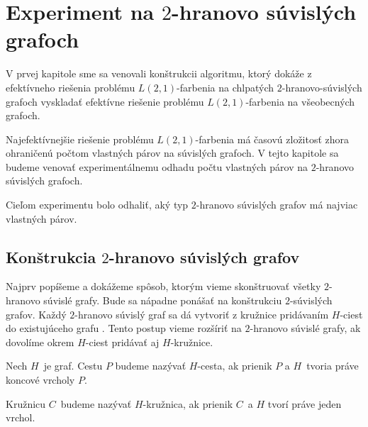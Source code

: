 \chapter{Experiment na $2$-hranovo súvislých grafoch}

V prvej kapitole sme sa venovali konštrukcii algoritmu, ktorý dokáže z efektívneho riešenia
problému $L(2,1)$-farbenia na chlpatých $2$-hranovo-súvislých grafoch vyskladať efektívne
riešenie problému $L(2,1)$-farbenia na všeobecných grafoch.

Najefektívnejšie riešenie problému $L(2,1)$-farbenia má časovú zložitosť zhora ohraničenú
počtom vlastných párov na súvislých grafoch. V tejto kapitole sa budeme venovať
experimentálnemu odhadu počtu vlastných párov na $2$-hranovo súvislých grafoch.

Cieľom experimentu bolo odhaliť, aký typ $2$-hranovo súvislých grafov má najviac
vlastných párov.

\section{Konštrukcia $2$-hranovo súvislých grafov}

Najprv popíšeme a dokážeme spôsob, ktorým vieme skonštruovať všetky $2$-hranovo
súvislé grafy. Bude sa nápadne ponášať na konštrukciu $2$-súvislých grafov. Každý
$2$-hranovo súvislý graf sa dá vytvoriť z kružnice pridávaním $H$-ciest do existujúceho
grafu \cite{diestel_graph}. Tento postup vieme rozšíriť na $2$-hranovo súvislé grafy, ak
dovolíme okrem $H$-ciest pridávať aj $H$-kružnice.

\begin{defn}
    Nech $H$ je graf. Cestu $P$ budeme nazývať $H$-cesta, ak prienik $P$ a $H$ tvoria
    práve koncové vrcholy $P$.

    Kružnicu $C$ budeme nazývať $H$-kružnica, ak prienik $C$ a $H$ tvorí
    práve jeden vrchol.
\end{defn}

